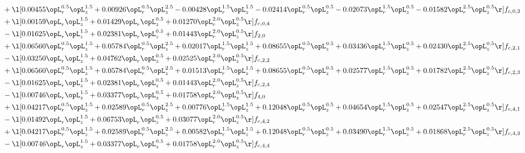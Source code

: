 \begin{alignat}{2}
& + \l[  0.00455 \opL_r^{0.5} \opL_z^{1.5} +  0.00926 \opL_r^{0.5} \opL_z^{2.5}   -0.00428 \opL_r^{1.5} \opL_z^{1.5}   -0.02414 \opL_r^{0.5} \opL_z^{0.5}   -0.02073 \opL_r^{1.5} \opL_z^{0.5}   -0.01582 \opL_r^{2.5} \opL_z^{0.5}  \r] f_{c,0,3} \nonumber \\ 
& + \l[  0.00159 \opL_r \opL_z^{1.5} +  0.01429 \opL_r \opL_z^{0.5} +  0.01270 \opL_r^{2.0} \opL_z^{0.5}  \r] f_{c,0,4} \nonumber \\ 
& - \l[  0.01625 \opL_r \opL_z^{1.5} +  0.02381 \opL_r \opL_z^{0.5} +  0.01443 \opL_r^{2.0} \opL_z^{0.5}  \r] f_{2,0} \nonumber \\ 
& + \l[  0.06560 \opL_r^{0.5} \opL_z^{1.5} +  0.05784 \opL_r^{0.5} \opL_z^{2.5} +  0.02017 \opL_r^{1.5} \opL_z^{1.5} +  0.08655 \opL_r^{0.5} \opL_z^{0.5} +  0.03436 \opL_r^{1.5} \opL_z^{0.5} +  0.02430 \opL_r^{2.5} \opL_z^{0.5}  \r] f_{c,2,1} \nonumber \\ 
& - \l[  0.03250 \opL_r \opL_z^{1.5} +  0.04762 \opL_r \opL_z^{0.5} +  0.02525 \opL_r^{2.0} \opL_z^{0.5}  \r] f_{c,2,2} \nonumber \\ 
& + \l[  0.06560 \opL_r^{0.5} \opL_z^{1.5} +  0.05784 \opL_r^{0.5} \opL_z^{2.5} +  0.01513 \opL_r^{1.5} \opL_z^{1.5} +  0.08655 \opL_r^{0.5} \opL_z^{0.5} +  0.02577 \opL_r^{1.5} \opL_z^{0.5} +  0.01782 \opL_r^{2.5} \opL_z^{0.5}  \r] f_{c,2,3} \nonumber \\ 
& - \l[  0.01625 \opL_r \opL_z^{1.5} +  0.02381 \opL_r \opL_z^{0.5} +  0.01443 \opL_r^{2.0} \opL_z^{0.5}  \r] f_{c,2,4} \nonumber \\ 
& - \l[  0.00746 \opL_r \opL_z^{1.5} +  0.03377 \opL_r \opL_z^{0.5} +  0.01758 \opL_r^{2.0} \opL_z^{0.5}  \r] f_{4,0} \nonumber \\ 
& + \l[  0.04217 \opL_r^{0.5} \opL_z^{1.5} +  0.02589 \opL_r^{0.5} \opL_z^{2.5} +  0.00776 \opL_r^{1.5} \opL_z^{1.5} +  0.12048 \opL_r^{0.5} \opL_z^{0.5} +  0.04654 \opL_r^{1.5} \opL_z^{0.5} +  0.02547 \opL_r^{2.5} \opL_z^{0.5}  \r] f_{c,4,1} \nonumber \\ 
& - \l[  0.01492 \opL_r \opL_z^{1.5} +  0.06753 \opL_r \opL_z^{0.5} +  0.03077 \opL_r^{2.0} \opL_z^{0.5}  \r] f_{c,4,2} \nonumber \\ 
& + \l[  0.04217 \opL_r^{0.5} \opL_z^{1.5} +  0.02589 \opL_r^{0.5} \opL_z^{2.5} +  0.00582 \opL_r^{1.5} \opL_z^{1.5} +  0.12048 \opL_r^{0.5} \opL_z^{0.5} +  0.03490 \opL_r^{1.5} \opL_z^{0.5} +  0.01868 \opL_r^{2.5} \opL_z^{0.5}  \r] f_{c,4,3} \nonumber \\ 
& - \l[  0.00746 \opL_r \opL_z^{1.5} +  0.03377 \opL_r \opL_z^{0.5} +  0.01758 \opL_r^{2.0} \opL_z^{0.5}  \r] f_{c,4,4} \nonumber \\ 
\end{alignat} 


